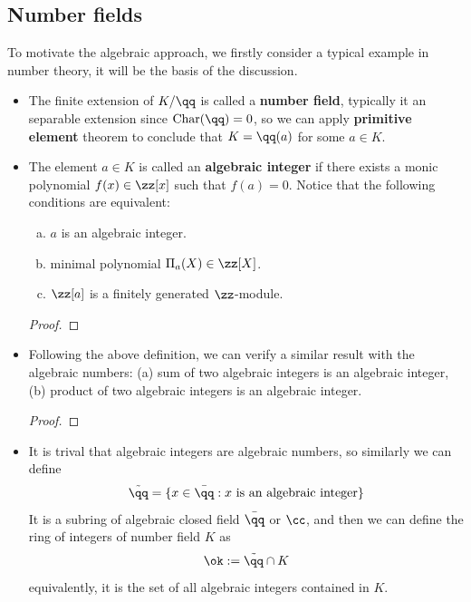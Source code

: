 \subsection{Number fields}

To motivate the algebraic approach, we firstly consider a typical example in number theory, it will be the basis of the discussion.

\begin{itemize}
    \item The finite extension of \(K/\qq\) is called a \textbf{number field}, typically it an separable extension since \(\mathrm{Char}(\qq) = 0\), so we can apply \textbf{primitive element} theorem to conclude that \(K = \qq(a)\) for some \(a \in K\).
    \item The element \(a \in K\) is called an \textbf{algebraic integer} if there exists a monic polynomial \(f(x) \in \zz[x]\) such that \(f(a) = 0\). Notice that the following conditions are equivalent:
    \begin{enumerate} [(a)]
        \item \(a\) is an algebraic integer.
        \item minimal polynomial \(\Pi_a(X) \in \zz[X]\).
        \item \(\zz[a]\) is a finitely generated \(\zz\)-module.
    \end{enumerate}
    \begin{proof}
        
    \end{proof}

    \item Following the above definition, we can verify a similar result with the algebraic numbers: (a) sum of two algebraic integers is an algebraic integer, (b) product of two algebraic integers is an algebraic integer.
    \begin{proof}
        
    \end{proof}
    \item It is trival that algebraic integers are algebraic numbers, so similarly we can define
    \[\tilde{\qq} = \{x \in \bar{\qq} : x \text{ is an algebraic integer}\}\]
    It is a subring of algebraic closed field \(\bar{\qq}\) or \(\cc\), and then we can define the ring of integers of number field \(K\) as 
    \[\ok := \tilde{\qq} \cap K\]
    equivalently, it is the set of all algebraic integers contained in \(K\). 
\end{itemize}

